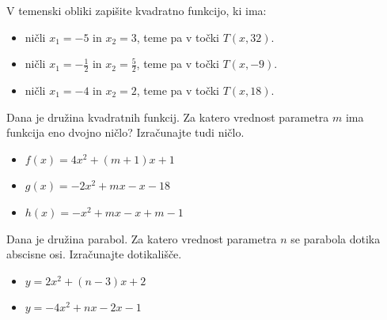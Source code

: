             \begin{naloga}
                V temenski obliki zapišite kvadratno funkcijo, ki ima:
                
                    \begin{itemize}
                        \item ničli $x_1=-5$ in $x_2=3$, teme pa v točki $T(x,32)$.
                        \item ničli $x_1=-\frac{1}{2}$ in $x_2=\frac{5}{2}$, teme pa v točki $T(x,-9)$.
                        \item ničli $x_1=-4$ in $x_2=2$, teme pa v točki $T(x,18)$.
                    \end{itemize}

            \end{naloga}

    


    

            \begin{naloga}
                Dana je družina kvadratnih funkcij.
                Za katero vrednost parametra $m$ ima funkcija eno dvojno ničlo?
                Izračunajte tudi ničlo.
                                
                    \begin{itemize}
                        \item $f(x)=4x^2+(m+1)x+1$ 
                        \item $g(x)=-2x^2+mx-x-18$
                        \item $h(x)=-x^2+mx-x+m-1$

                    \end{itemize}

            \end{naloga}


            \begin{naloga}
                Dana je družina parabol.
                Za katero vrednost parametra $n$ se parabola dotika abscisne osi. 
                Izračunajte dotikališče.
                
                    \begin{itemize}
                        \item $y=2x^2+(n-3)x+2$
                        \item $y=-4x^2+nx-2x-1$
                    \end{itemize}

            \end{naloga}

